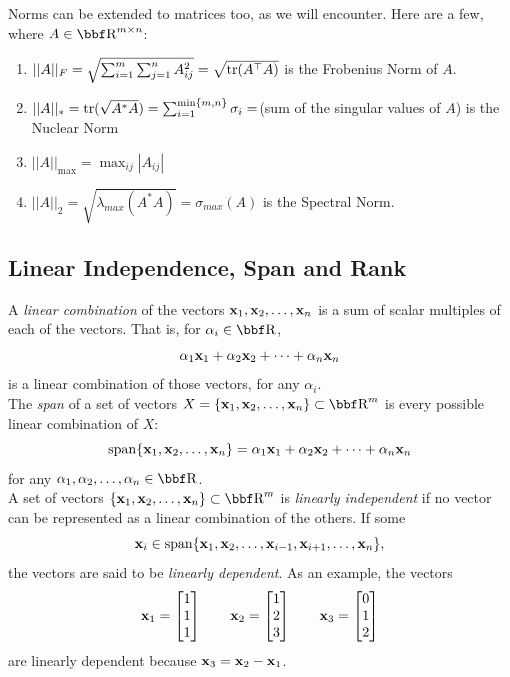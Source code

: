 \documentclass{article}
\begin{document}
Norms can be extended to matrices too, as we will encounter. Here are
a few, where $A\in\RR^{m\times n}$:
\begin{enumerate}
    \item $||A||_F = \sqrt{\sum_{i=1}^m\sum_{j=1}^n A_{ij}^2} = \sqrt{{\hbox{tr}}(A^\top A)}$ is the Frobenius Norm of $A$.
    \item $||A||_* = {\hbox{tr}}(\sqrt{A^* A}) = \sum_{i=1}^{\min\{m,n\}}\sigma_i = $(sum of the singular values of $A$) is the Nuclear Norm
    \item $||A||_{\mathrm{max}} = \max_{ij}|A_{ij}|$
    \item $||A||_2 = \sqrt{\lambda_{max}(A^* A)} = \sigma_{max}(A)$ is the Spectral Norm.
\end{enumerate}

\subsection{Linear Independence, Span and Rank}

A \textit{linear combination} of the vectors ${\bf x}_1,{\bf x}_2,\dots,{\bf x}_n$ is a sum
of scalar multiples of each of the vectors. That is, for $\alpha_i\in\RR$,
\[
    \alpha_1{\bf x}_1 + \alpha_2{\bf x}_2 + \dots + \alpha_n{\bf x}_n
\]
is a linear combination of those vectors, for any $\alpha_i$.\\

The \textit{span} of a set of vectors $X = \{\xx_1,\xx_2,\dots,\xx_n\} \subset \RR^m$
is every possible linear combination of $X$:
\[
    \mathrm{span}\{{\bf x}_1,{\bf x}_2,\dots,{\bf x}_n\} = \alpha_1{\bf x}_1 + \alpha_2{\bf x}_2 + \dots + \alpha_n{\bf x}_n
\]
for any $\alpha_1,\alpha_2,\dots,\alpha_n\in\RR$.\\

A set of vectors $\{\xx_1,\xx_2,\dots,\xx_n\} \subset \RR^m$ is
\textit{linearly independent} if no vector can be represented as
a linear combination of the others. If some
\[
    {\bf x}_i \in \mathrm{span}\{{\bf x}_1,{\bf x}_2,\dots, {\bf x}_{i-1}, {\bf x}_{i+1},\dots,{\bf x}_n\},
\]
the vectors are said to be \textit{linearly dependent}. As an example,
the vectors
\[
    {\bf x}_1 = \begin{bmatrix} 1\\1\\1 \end{bmatrix} \qquad {\bf x}_2 = \begin{bmatrix} 1\\2\\3 \end{bmatrix} \qquad {\bf x}_3 = \begin{bmatrix} 0\\1\\2 \end{bmatrix}
\]
are linearly dependent because ${\bf x}_3 = {\bf x}_2-{\bf x}_1$.\\
\end{document}
